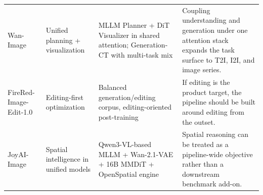 \begin{table}[t]
\begin{tabularx}{\textwidth}{@{}>{\raggedright\arraybackslash}p{2.9cm}>{\raggedright\arraybackslash}p{2.4cm}>{\raggedright\arraybackslash}p{4.0cm}>{\raggedright\arraybackslash}X@{}}
Wan-Image \citep{mao2026wan} & Unified planning + visualization & MLLM Planner + DiT Visualizer in shared attention; Generation-CT with multi-task mix & Coupling understanding and generation under one attention stack expands the task surface to T2I, I2I, and image series. \\
FireRed-Image-Edit-1.0 \citep{team2026firered} & Editing-first optimization & Balanced generation/editing corpus, editing-oriented post-training & If editing is the product target, the pipeline should be built around editing from the outset. \\
JoyAI-Image \citep{jdjoyaiimage} & Spatial intelligence in unified models & Qwen3-VL-based MLLM + Wan-2.1-VAE + 16B MMDiT + OpenSpatial engine & Spatial reasoning can be treated as a pipeline-wide objective rather than a downstream benchmark add-on. \\
\bottomrule
\end{tabularx}
\end{table}

